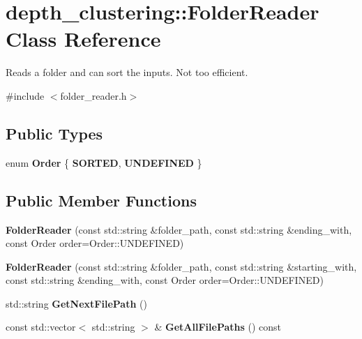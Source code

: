 \hypertarget{classdepth__clustering_1_1FolderReader}{\section{depth\-\_\-clustering\-:\-:Folder\-Reader Class Reference}
\label{classdepth__clustering_1_1FolderReader}
}


Reads a folder and can sort the inputs. Not too efficient.  




{\ttfamily \#include $<$folder\-\_\-reader.\-h$>$}

\subsection*{Public Types}
\begin{DoxyCompactItemize}
\item 
enum {\bfseries Order} \{ {\bfseries S\-O\-R\-T\-E\-D}, 
{\bfseries U\-N\-D\-E\-F\-I\-N\-E\-D}
 \}
\end{DoxyCompactItemize}
\subsection*{Public Member Functions}
\begin{DoxyCompactItemize}
\item 
\hypertarget{classdepth__clustering_1_1FolderReader_a80ae7f477c0ba4ca20e58e0eff0874b2}{{\bfseries Folder\-Reader} (const std\-::string \&folder\-\_\-path, const std\-::string \&ending\-\_\-with, const Order order=Order\-::\-U\-N\-D\-E\-F\-I\-N\-E\-D)}\label{classdepth__clustering_1_1FolderReader_a80ae7f477c0ba4ca20e58e0eff0874b2}

\item 
\hypertarget{classdepth__clustering_1_1FolderReader_a298f7b246759d1d926746e057c9d96a0}{{\bfseries Folder\-Reader} (const std\-::string \&folder\-\_\-path, const std\-::string \&starting\-\_\-with, const std\-::string \&ending\-\_\-with, const Order order=Order\-::\-U\-N\-D\-E\-F\-I\-N\-E\-D)}\label{classdepth__clustering_1_1FolderReader_a298f7b246759d1d926746e057c9d96a0}

\item 
\hypertarget{classdepth__clustering_1_1FolderReader_aeb4575a662afa48264fec96f4802db90}{std\-::string {\bfseries Get\-Next\-File\-Path} ()}\label{classdepth__clustering_1_1FolderReader_aeb4575a662afa48264fec96f4802db90}

\item 
\hypertarget{classdepth__clustering_1_1FolderReader_a416eee1780485b6d677488d3e44014d0}{const std\-::vector$<$ std\-::string $>$ \& {\bfseries Get\-All\-File\-Paths} () const }\label{classdepth__clustering_1_1FolderReader_a416eee1780485b6d677488d3e44014d0}

\end{DoxyCompactItemize}
